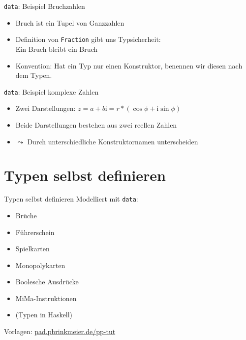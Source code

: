 \documentclass{beamer}
\begin{document}
\begin{frame}{\texttt{data}: Beispiel Bruchzahlen}

    \begin{itemize}
        \item Bruch ist ein Tupel von Ganzzahlen
        \item Definition von \texttt{Fraction} gibt uns Typsicherheit:\\
              Ein Bruch bleibt ein Bruch
        \item Konvention: Hat ein Typ nur einen Konstruktor, benennen wir diesen nach dem Typen.
    \end{itemize}
\end{frame}

\begin{frame}{\texttt{data}: Beispiel komplexe Zahlen}

    \begin{itemize}
        \item Zwei Darstellungen: $z = a + b\text{i} = r * (\cos \phi + \text{i} \sin \phi)$
        \item Beide Darstellungen bestehen aus zwei reellen Zahlen
        \item $\leadsto$ Durch unterschiedliche Konstruktornamen unterscheiden
    \end{itemize}
\end{frame}

\section{Typen selbst definieren}

\begin{frame}{Typen selbst definieren}
  Modelliert mit \texttt{data}:

  \vfill

  \begin{itemize}
    \item Brüche
    \item Führerschein
    \item Spielkarten
    \item Monopolykarten
    \item Boolesche Ausdrücke
    \item MiMa-Instruktionen
    \item (Typen in Haskell)
  \end{itemize}

  \vfill

  Vorlagen: \href{https://pad.pbrinkmeier.de/pp-tut}{pad.pbrinkmeier.de/pp-tut}
\end{frame}
\end{document}
